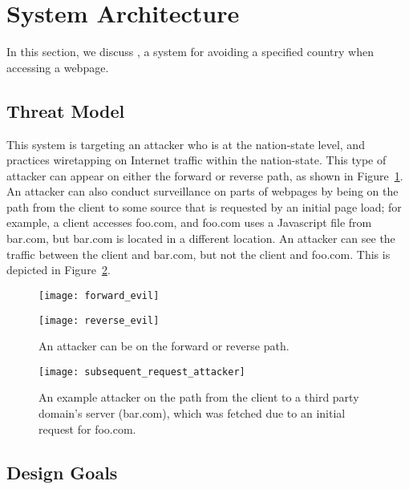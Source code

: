 \section{System Architecture}
\label{architecture}

In this section, we discuss \system{}, a system for avoiding a specified country when accessing a webpage.

\subsection{Threat Model}
\label{threat}
This system is targeting an attacker who is at the nation-state level, and practices wiretapping on Internet traffic within the nation-state.  This type of attacker can appear on either the forward or reverse path, as shown in Figure~\ref{fig:attacker}. An attacker can also conduct surveillance on parts of webpages by being on the path from the client to some source that is requested by an initial page load; for example, a client accesses foo.com, and foo.com uses a Javascript file from bar.com, but bar.com is located in a different location.  An attacker can see the traffic between the client and bar.com, but not the client and foo.com.  This is depicted in Figure~\ref{fig:domains_attacker}.

\begin{figure}[t]
\begin{minipage}[c][11cm][t]{.5\textwidth}
  \centering
  \texttt{[image: forward\_evil]}
  \label{fig:forward_attack}\par\vfill
  \texttt{[image: reverse\_evil]}
  \label{fig:reverse_attack}
\end{minipage}
\caption{An attacker can be on the forward or reverse path.}
\label{fig:attacker}
\end{figure}

\begin{figure}[t]
\centering
\texttt{[image: subsequent\_request\_attacker]}
\caption{An example attacker on the path from the client to a third party domain's server (bar.com), which was fetched due to an initial request for foo.com.}
\label{fig:domains_attacker}
\end{figure}

\subsection{Design Goals}

